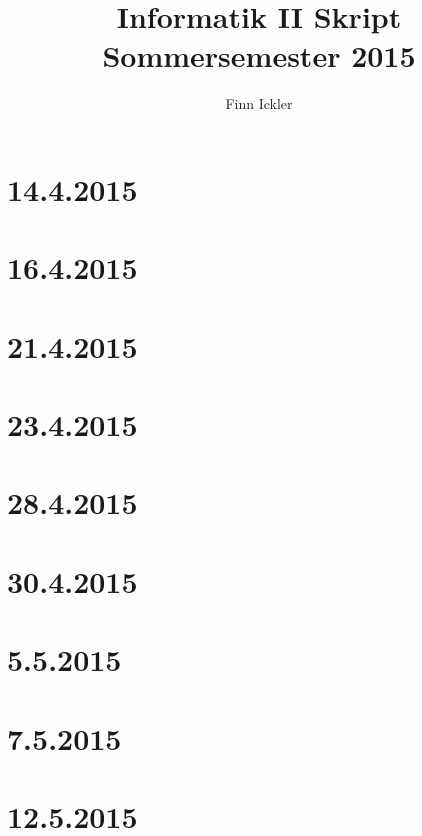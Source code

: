 \documentclass[a4paper,12pt]{scrartcl}
\author{Finn Ickler}
\title{Informatik II Skript Sommersemester 2015}
\begin{document}
\maketitle
\tableofcontents
\newpage
\section{14.4.2015}

\section{16.4.2015}

\section{21.4.2015}

\section{23.4.2015}

\section{28.4.2015}

\section{30.4.2015}

\section{5.5.2015}
\newpage
\section{7.5.2015}

\section{12.5.2015}

\end{document}
